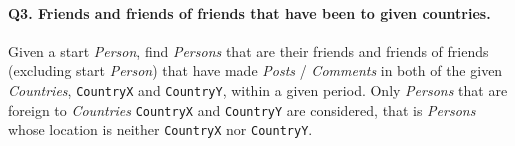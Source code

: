 \paragraph{\textbf{Q3}. Friends and friends of friends that have been to given countries.}
Given a start \emph{Person}, find \emph{Persons} that are their friends
and friends of friends (excluding start \emph{Person}) that have made
\emph{Posts} / \emph{Comments} in both of the given \emph{Countries},
\texttt{CountryX} and \texttt{CountryY}, within a given period. Only
\emph{Persons} that are foreign to \emph{Countries} \texttt{CountryX}
and \texttt{CountryY} are considered, that is \emph{Persons} whose
location is neither \texttt{CountryX} nor \texttt{CountryY}.
